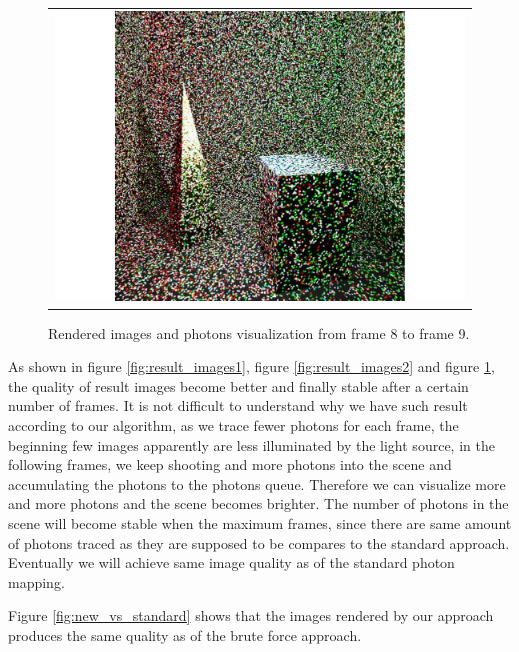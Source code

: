 \begin{figure}
\begin{center}
{\begin{tabular}{c}
\includegraphics*[scale=0.2]{imgs/pqv_frame9.pdf}
\end{tabular}
}%
\renewcommand{\thefigure}{\thechapter.\arabic{figure}}
\caption[Rendered images and photons visualization from frame 8 to frame 9]{Rendered images and photons visualization from frame 8 to frame 9.}
\label{fig:result_images3}
\end{center}
\end{figure}

As shown in figure \ref{fig:result_images1}, figure \ref{fig:result_images2} and figure \ref{fig:result_images3}, the quality of 	result images become better and finally stable after a certain number of frames. It is not difficult to understand why we have such result according to our algorithm, as we trace fewer photons for each frame, the beginning few images apparently are less illuminated by the light source, in the following frames, we keep shooting and more photons into the scene and accumulating the photons to the photons queue. Therefore we can visualize more and more photons and the scene becomes brighter. The number of photons in the scene will become stable when the maximum frames, since there are same amount of photons traced as they are supposed to be compares to the standard approach. Eventually we will achieve same image quality as of the standard photon mapping.

Figure \ref{fig:new_vs_standard} shows that the images rendered by our approach produces the same quality as of the brute force approach. 

